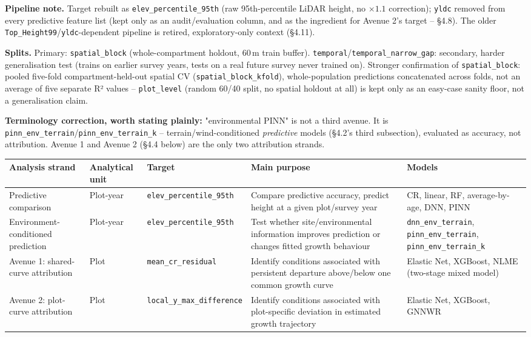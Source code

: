 \textbf{Pipeline note.} Target rebuilt as \texttt{elev\_percentile\_95th} (raw 95th-percentile
LiDAR height, no $\times1.1$ correction); \texttt{yldc} removed from every predictive feature list
(kept only as an audit/evaluation column, and as the ingredient for Avenue 2's target -- \S4.8).
The older \texttt{Top\_Height99}/\texttt{yldc}-dependent pipeline is retired, exploratory-only
context (\S4.11).

\textbf{Splits.} Primary: \texttt{spatial\_block} (whole-compartment holdout, 60\,m train buffer).
\texttt{temporal}/\texttt{temporal\_narrow\_gap}: secondary, harder generalisation test (trains on
earlier survey years, tests on a real future survey never trained on). Stronger confirmation of
\texttt{spatial\_block}: pooled five-fold compartment-held-out spatial CV
(\texttt{spatial\_block\_kfold}), whole-population predictions concatenated across folds, not an
average of five separate R² values -- \texttt{plot\_level} (random 60/40 split, no spatial holdout
at all) is kept only as an easy-case sanity floor, not a generalisation claim.

\textbf{Terminology correction, worth stating plainly:} "environmental PINN" is not a third
avenue. It is \texttt{pinn\_env\_terrain}/\texttt{pinn\_env\_terrain\_k} -- terrain/wind-conditioned
\emph{predictive} models (\S4.2's third subsection), evaluated as accuracy, not attribution.
Avenue 1 and Avenue 2 (\S4.4 below) are the only two attribution strands.

\begin{table}[!htbp]
\centering
\scriptsize
\setlength{\tabcolsep}{3pt}
\renewcommand{\arraystretch}{0.95}
\begin{tabular}{p{2.3cm}p{1.4cm}p{3.2cm}p{4.2cm}p{2.5cm}}
\hline
Analysis strand & Analytical unit & Target & Main purpose & Models \\
\hline
Predictive comparison & Plot-year & \texttt{elev\_percentile\_95th} & Compare predictive accuracy, predict height at a given plot/survey year & CR, linear, RF, average-by-age, DNN, PINN \\
Environment-conditioned prediction & Plot-year & \texttt{elev\_percentile\_95th} & Test whether site/environmental information improves prediction or changes fitted growth behaviour & \texttt{dnn\_env\_terrain}, \texttt{pinn\_env\_terrain}, \texttt{pinn\_env\_terrain\_k} \\
Avenue 1: shared-curve attribution & Plot & \texttt{mean\_cr\_residual} & Identify conditions associated with persistent departure above/below one common growth curve & Elastic Net, XGBoost, NLME (two-stage mixed model) \\
Avenue 2: plot-curve attribution & Plot & \texttt{local\_y\_max\_difference} & Identify conditions associated with plot-specific deviation in estimated growth trajectory & Elastic Net, XGBoost, GNNWR \\
\hline
\end{tabular}
\end{table}

